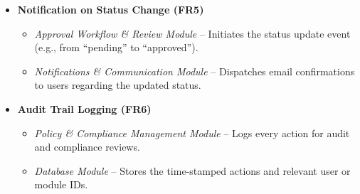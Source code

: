 \documentclass[12pt, titlepage]{article}
\begin{document}
\begin{itemize}
  \item \textbf{Notification on Status Change (FR5)}
    \begin{itemize}
      \item \emph{Approval Workflow \& Review Module} – Initiates the status update event (e.g., from “pending” to “approved”).
      \item \emph{Notifications \& Communication Module} – Dispatches email confirmations to users regarding the updated status.
    \end{itemize}

  \item \textbf{Audit Trail Logging (FR6)}
    \begin{itemize}
      \item \emph{Policy \& Compliance Management Module} – Logs every action for audit and compliance reviews.
      \item \emph{Database Module} – Stores the time-stamped actions and relevant user or module IDs.
    \end{itemize}
\end{itemize}
\end{document}
